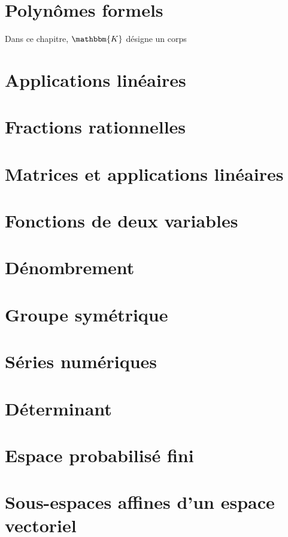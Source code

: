 \documentclass[a4paper]{report}
\newcommand{\chap}[2][0]{
	\setcounter{chapter}{#1 - 1}
	\chapter{#2}
	\renewcommand*\parttitle{#2}
}
\begin{document}
	{
		\chap[18]{Polynômes formels}
		\renewcommand{\cwd}{../chap18}
		Dans ce chapitre, $\mathbbm{K}$ désigne un corps
		
		
		
		
	}

	{
		\chap[19]{Applications linéaires}
		\renewcommand{\cwd}{../chap19}
		
		
		
		
		
	}

	{
		\chap[20]{Fractions rationnelles}
		\renewcommand{\cwd}{../chap20}
		
		
	}

	{
		\chap[21]{Matrices et applications linéaires}
		\renewcommand{\cwd}{../chap21}
		
		
		
		
		
		
	}

	{
		\chap[22]{Fonctions de deux variables}
		\renewcommand{\cwd}{../chap22}
		
		
		
	}

	{
		\chap[23]{Dénombrement}
		\renewcommand{\cwd}{../chap23}
		
		
		
	}

	{
		\chap[24]{Groupe symétrique}
		\renewcommand{\cwd}{../chap24}
		
		
		
		
	}

	{
		\chap[25]{Séries numériques}
		\renewcommand{\cwd}{../chap25}
		
		
		
		
		
		
		
		
	}

	{
		\chap[26]{Déterminant}
		\renewcommand{\cwd}{../chap26}
		
		
		
		
		
	}

	{
		\chap[27]{Espace probabilisé fini}
		\renewcommand{\cwd}{../chap27}
		\let\overlin\overline
		\let\overline\bar
		
		
		
	}

	{
		\chap[28]{Sous-espaces affines d'un espace vectoriel}
		\renewcommand{\cwd}{../chap28}
		
	}

	\clearpage
	\lhead{}
	\renewcommand*\parttitle{Index}
	\printindex
\end{document}
